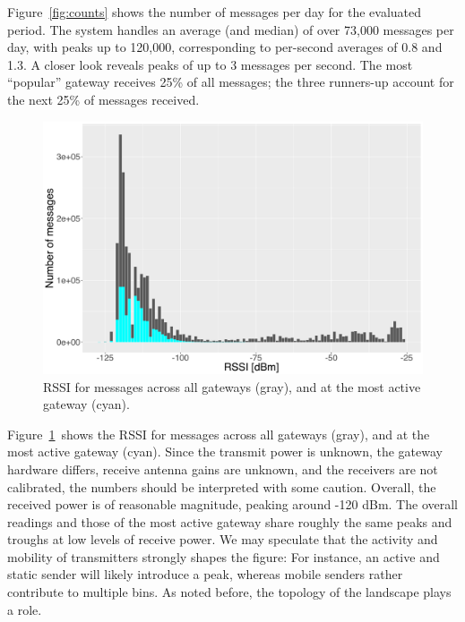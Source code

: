 Figure~\ref{fig:counts} shows the number of messages per day for the
evaluated period. The system handles an average (and median) of over
73,000 messages per day, with peaks up to 120,000, corresponding to
per-second averages of 0.8 and 1.3. A closer look reveals peaks
of up to 3 messages per second. The most ``popular'' gateway
receives 25\% of all messages; the three runners-up account for
the next 25\% of messages received.

\begin{figure}
  \centering
  \includegraphics[width=\columnwidth]{figures/rssi.pdf}
  \caption{\acrshort{RSSI} for messages across all gateways (gray), and at the most active gateway (cyan).}
  \label{fig:rssi}
\end{figure}

Figure~\ref{fig:rssi} shows the \acrfull{RSSI} for messages across all
gateways (gray), and at the most active gateway (cyan).
Since the transmit power is unknown, the gateway hardware differs,
receive antenna gains are unknown, and the receivers are not calibrated,
the numbers should be interpreted with some caution.
Overall, the received power is of reasonable magnitude,
peaking around -120 dBm. The overall readings and those of
the most active gateway share roughly the same peaks and troughs
at low levels of receive power. We may speculate that the activity
and mobility of transmitters strongly shapes the figure: For instance,
an active and static sender will likely introduce a peak, whereas
mobile senders rather contribute to multiple bins. As noted before,
the topology of the landscape plays a role.

